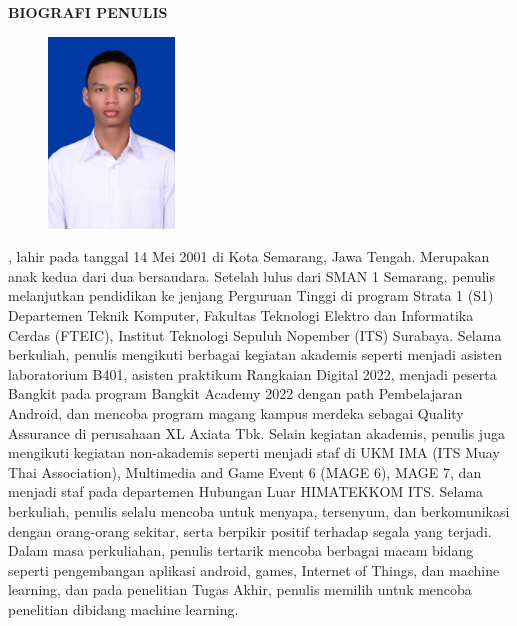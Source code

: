 \begin{center}
  \Large
  \textbf{BIOGRAFI PENULIS}
\end{center}


\vspace{2ex}

\begin{figure}
  \centering
  \vspace{-3ex}
  \includegraphics[width=0.3\textwidth]{gambar/Foto Bio.jpg}
  \vspace{-4ex}
\end{figure}

\name{}, lahir pada tanggal 14 Mei 2001 di Kota Semarang, Jawa Tengah. Merupakan anak kedua dari 
dua bersaudara. Setelah lulus dari SMAN 1 Semarang, penulis melanjutkan pendidikan ke jenjang 
Perguruan Tinggi di program Strata 1 (S1) Departemen Teknik Komputer, Fakultas Teknologi Elektro 
dan Informatika Cerdas (FTEIC), Institut Teknologi Sepuluh Nopember (ITS) Surabaya. Selama berkuliah, 
penulis mengikuti berbagai kegiatan akademis seperti menjadi asisten laboratorium B401, asisten 
praktikum Rangkaian Digital 2022, menjadi peserta Bangkit pada program Bangkit Academy 2022 dengan path 
Pembelajaran Android, dan mencoba program magang kampus merdeka sebagai Quality Assurance di perusahaan 
XL Axiata Tbk. Selain kegiatan akademis, penulis juga mengikuti kegiatan non-akademis seperti menjadi 
staf di UKM IMA (ITS Muay Thai Association), Multimedia and Game Event 6 (MAGE 6), MAGE 7, dan menjadi 
staf pada departemen Hubungan Luar HIMATEKKOM ITS. Selama berkuliah, penulis selalu mencoba untuk menyapa, 
tersenyum, dan berkomunikasi dengan orang-orang sekitar, serta berpikir positif terhadap segala yang terjadi. 
Dalam masa perkuliahan, penulis tertarik mencoba berbagai macam bidang seperti pengembangan aplikasi android, 
games, Internet of Things, dan machine learning, dan pada penelitian Tugas Akhir, penulis memilih untuk 
mencoba penelitian dibidang machine learning.
